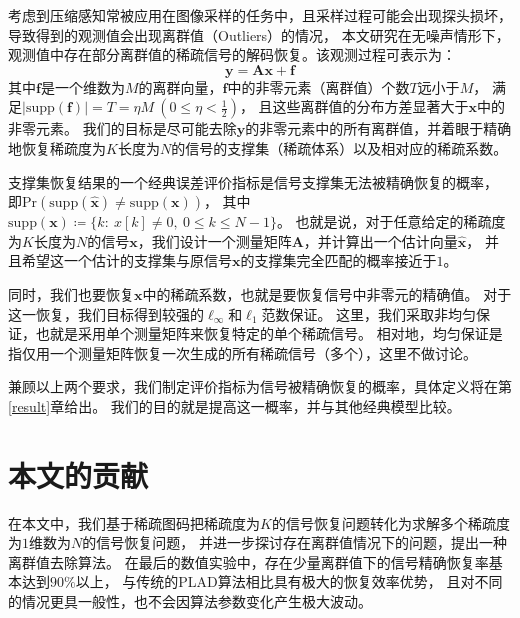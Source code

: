 \documentclass[AutoFakeBold]{LZUThesis}
\begin{document}
考虑到压缩感知常被应用在图像采样的任务中，且采样过程可能会出现探头损坏，导致得到的观测值会出现离群值（Outliers）的情况，
本文研究在无噪声情形下，观测值中存在部分离群值的稀疏信号的解码恢复。该观测过程可表示为：
\begin{equation}
    \mathbf{y} = \mathbf{Ax} + \mathbf{f}
\end{equation}
其中$\mathbf{f}$是一个维数为$M$的离群向量，$\mathbf{f}$中的非零元素（离群值）个数$T$远小于$M$，
满足$\left | \mathrm{supp} (\mathbf{f}) \right | = T = \eta M \ (0 \leq \eta < \frac{1}{2})$，
且这些离群值的分布方差显著大于$\mathbf{x}$中的非零元素。
我们的目标是尽可能去除$\mathbf{y}$的非零元素中的所有离群值，并着眼于精确地恢复稀疏度为$K$长度为$N$的信号的支撑集（稀疏体系）以及相对应的稀疏系数。

支撑集恢复结果的一个经典误差评价指标是信号支撑集无法被精确恢复的概率，
即$\mathrm{Pr}(\mathrm{supp}(\hat{\mathbf{x}}) \neq \mathrm{supp}(\mathbf{x}))$，
其中$\mathrm{supp}(\mathbf{x}) \coloneq \{k:\ x[k] \neq 0,\ 0 \leq k \leq N-1\}$。
也就是说，对于任意给定的稀疏度为$K$长度为$N$的信号$\mathbf{x}$，我们设计一个测量矩阵$\mathbf{A}$，并计算出一个估计向量$\hat{\mathbf{x}}$，
并且希望这一个估计的支撑集与原信号$\mathbf{x}$的支撑集完全匹配的概率接近于$1$。

同时，我们也要恢复$\mathbf{x}$中的稀疏系数，也就是要恢复信号中非零元的精确值。
对于这一恢复，我们目标得到较强的$\ell_{\infty}$和$\ell_{1}$范数保证。 
这里，我们采取非均匀保证\cite{elad2010sparse}，也就是采用单个测量矩阵来恢复特定的单个稀疏信号。
相对地，均匀保证是指仅用一个测量矩阵恢复一次生成的所有稀疏信号（多个），这里不做讨论。

兼顾以上两个要求，我们制定评价指标为信号被精确恢复的概率，具体定义将在第\ref{result}章给出。
我们的目的就是提高这一概率，并与其他经典模型比较。

\section{本文的贡献}

在本文中，我们基于稀疏图码把稀疏度为$K$的信号恢复问题转化为求解多个稀疏度为$1$维数为$N$的信号恢复问题，
并进一步探讨存在离群值情况下的问题，提出一种离群值去除算法。
在最后的数值实验中，存在少量离群值下的信号精确恢复率基本达到$90\%$以上，
与传统的PLAD算法\cite{doi:10.1137/090777761, WANG2013135}相比具有极大的恢复效率优势，
且对不同的情况更具一般性，也不会因算法参数变化产生极大波动。
\end{document}
